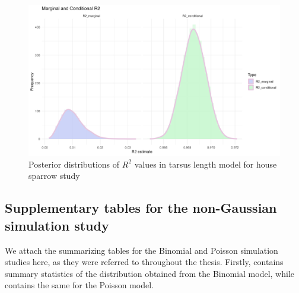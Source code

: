 \begin{figure}[H]%
  \centering
  \includegraphics[width=1\linewidth]{Figures/House sparrow study/Tarsus_r2.png}
  \caption[Posterior distributions of $R^2$ values in tarsus length model for house sparrow study]{Posterior distributions of $R^2$ values in tarsus length model for house sparrow study}
  \label{fig:tarsus_r2}
\end{figure}

\subsection*{Supplementary tables for the non-Gaussian simulation study}
We attach the summarizing tables for the Binomial and Poisson simulation studies here, as they were referred to throughout the thesis. Firstly,  contains summary statistics of the distribution obtained from the Binomial model, while  contains the same for the Poisson model.

